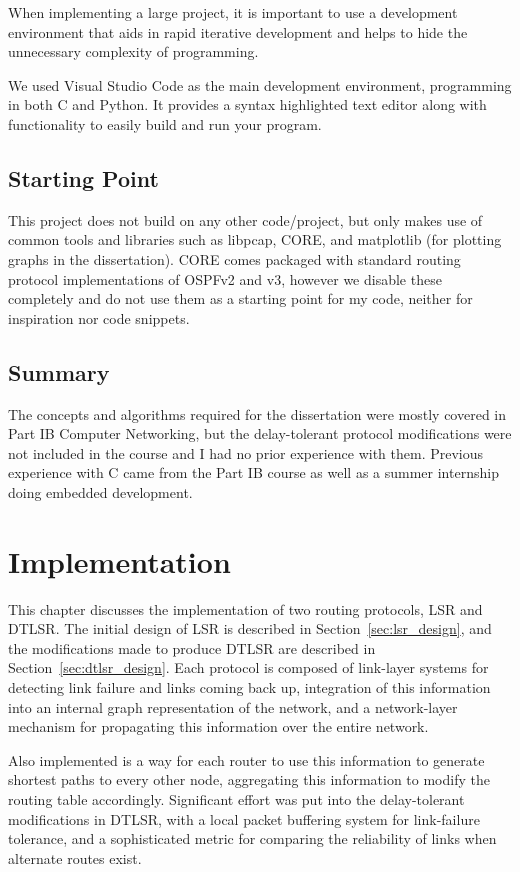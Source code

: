 \documentclass[withindex,glossary,openany]{cam-thesis}
\begin{document}
When implementing a large project, it is important to use a development environment that aids in rapid iterative development and helps to hide the unnecessary complexity of programming.

We used Visual Studio Code as the main development environment, programming in both C and Python. It provides a syntax highlighted text editor along with functionality to easily build and run your program.


\section{Starting Point}

This project does not build on any other code/project, but only makes use of common tools and libraries such as libpcap, CORE, and matplotlib (for plotting graphs in the dissertation). CORE comes packaged with standard routing protocol implementations of OSPFv2 and v3, however we disable these completely and do not use them as a starting point for my code, neither for inspiration nor code snippets.

\section{Summary}

The concepts and algorithms required for the dissertation were mostly covered in Part IB Computer Networking, but the delay-tolerant protocol modifications were not included in the course and I had no prior experience with them. Previous experience with C came from the Part IB course as well as a summer internship doing embedded development.

\chapter{Implementation}

This chapter discusses the implementation of two routing protocols, LSR and DTLSR. The initial design of LSR is described in Section~\ref{sec:lsr_design}, and the modifications made to produce DTLSR are described in Section~\ref{sec:dtlsr_design}. Each protocol is composed of link-layer systems for detecting link failure and links coming back up, integration of this information into an internal graph representation of the network, and a network-layer mechanism for propagating this information over the entire network.

Also implemented is a way for each router to use this information to generate shortest paths to every other node, aggregating this information to modify the routing table accordingly. Significant effort was put into the delay-tolerant modifications in DTLSR, with a local packet buffering system for link-failure tolerance, and a sophisticated metric for comparing the reliability of links when alternate routes exist.
\end{document}
